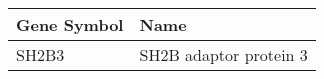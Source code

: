 \begin{tabular}{ll}
\toprule
Gene Symbol &                   Name \\
\midrule
      SH2B3 & SH2B adaptor protein 3 \\
\bottomrule
\end{tabular}

